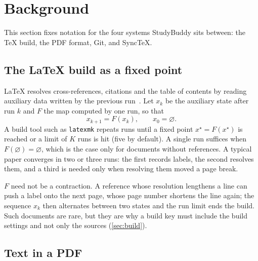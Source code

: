 \section{Background}
\label{sec:background}

This section fixes notation for the four systems StudyBuddy sits between: the
\TeX{} build, the PDF format, Git, and SyncTeX.

\subsection{The \LaTeX{} build as a fixed point}

\LaTeX{} resolves cross-references, citations and the table of contents by
reading auxiliary data written by the previous run~\cite{lamport1994}. Let
$x_k$ be the auxiliary state after run $k$ and $F$ the map computed by one run,
so that
\begin{equation}
  x_{k+1} = F(x_k), \qquad x_0 = \varnothing .
  \label{eq:fixed-point}
\end{equation}
A build tool such as \texttt{latexmk} repeats runs until a fixed point
$x^{\star} = F(x^{\star})$ is reached or a limit of $K$ runs is hit (five by
default). A single run suffices when $F(\varnothing) = \varnothing$, which is
the case only for documents without references. A typical paper converges in
two or three runs: the first records labels, the second resolves them, and a
third is needed only when resolving them moved a page break.

\begin{remark}
$F$ need not be a contraction. A reference whose resolution lengthens a line
can push a label onto the next page, whose page number shortens the line again;
the sequence $x_k$ then alternates between two states and the run limit ends
the build. Such documents are rare, but they are why a build key must include
the build settings and not only the sources (\cref{sec:build}).
\end{remark}

\subsection{Text in a PDF}

